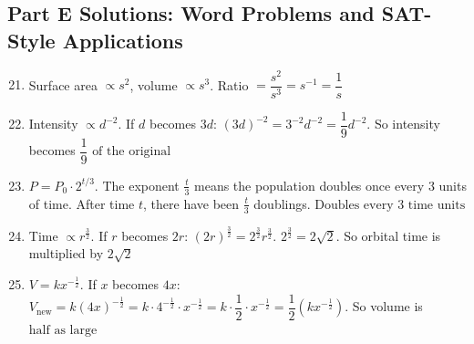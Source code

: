 \documentclass[14pt]{extarticle}
\begin{document}
\subsection*{Part E Solutions: Word Problems and SAT-Style Applications}
\begin{enumerate}
  \setcounter{enumi}{20}
  \item Surface area \(\propto s^2\), volume \(\propto s^3\).  
  Ratio \(= \dfrac{s^2}{s^3} = s^{-1} = \boxed{\dfrac{1}{s}}\)

  \item Intensity \(\propto d^{-2}\).  
  If \(d\) becomes \(3d\): \((3d)^{-2} = 3^{-2} d^{-2} = \dfrac{1}{9} d^{-2}\).  
  So intensity becomes \(\boxed{\dfrac{1}{9}\text{ of the original}}\)

  \item \(P = P_0 \cdot 2^{t/3}\).  
  The exponent \(\frac{t}{3}\) means the population doubles once every 3 units of time.  
  After time \(t\), there have been \(\frac{t}{3}\) doublings.  
  \(\boxed{\text{Doubles every 3 time units}}\)

  \item Time \(\propto r^{\frac{3}{2}}\).  
  If \(r\) becomes \(2r\): \((2r)^{\frac{3}{2}} = 2^{\frac{3}{2}} r^{\frac{3}{2}}\).  
  \(2^{\frac{3}{2}} = 2 \sqrt{2}\).  
  So orbital time is multiplied by \(\boxed{2\sqrt{2}}\)

  \item \(V = kx^{-\frac{1}{2}}\).  
  If \(x\) becomes \(4x\):  
  \(V_{\text{new}} = k(4x)^{-\frac{1}{2}} = k \cdot 4^{-\frac{1}{2}} \cdot x^{-\frac{1}{2}}
  = k \cdot \dfrac{1}{2} \cdot x^{-\frac{1}{2}}
  = \dfrac{1}{2} (kx^{-\frac{1}{2}})\).  
  So volume is \(\boxed{\text{half as large}}\)
\end{enumerate}




\end{document}
